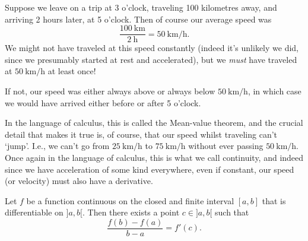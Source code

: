 
\begin{example}
	Suppose we leave on a trip at 3 o'clock, traveling 100 kilometres away, and arriving 2 hours later, at 5 o'clock. Then of course our average speed was
	\[
		\frac{\SI{100}{\kilo\metre}}{\SI{2}{\hour}} = \SI[per-mode = symbol]{50}{\kilo\metre\per\hour}.
	\]
	We might not have traveled at this speed constantly (indeed it's unlikely we did, since we presumably started at rest and accelerated), but we \emph{must} have traveled at $\SI[per-mode = symbol]{50}{\kilo\metre\per\hour}$ at least once!

	If not, our speed was either always above or always below $\SI[per-mode = symbol]{50}{\kilo\metre\per\hour}$, in which case we would have arrived either before or after 5 o'clock.
\end{example}

\noindent
In the language of calculus, this is called the Mean-value theorem, and the crucial detail that makes it true is, of course, that our speed whilst traveling can't `jump'. I.e., we can't go from $\SI[per-mode = symbol]{25}{\kilo\metre\per\hour}$ to $\SI[per-mode = symbol]{75}{\kilo\metre\per\hour}$ without ever passing $\SI[per-mode = symbol]{50}{\kilo\metre\per\hour}$. Once again in the language of calculus, this is what we call continuity, and indeed since we have acceleration of some kind everywhere, even if constant, our speed (or velocity) must also have a derivative.

\begin{theorem}
	Let $f$ be a function continuous on the closed and finite interval $[a, b]$ that is differentiable on $]{a, b}[$. Then there exists a point $c \in {]{a, b}[}$ such that
	\[
		\frac{f(b) - f(a)}{b - a} = f'(c).
	\]
\end{theorem}

